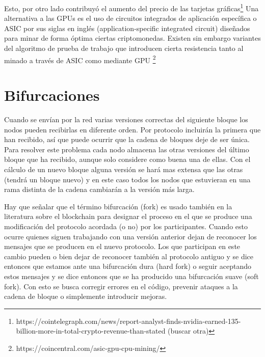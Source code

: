 Esto, por otro lado contribuyó el aumento del precio de las tarjetas gráficas\footnote{https://cointelegraph.com/news/report-analyst-finds-nvidia-earned-135-billion-more-in-total-crypto-revenue-than-stated (buscar otra)}
Una alternativa a las GPUs es el uso de circuitos integrados de aplicación específica o ASIC por sus siglas en inglés (application-specific integrated circuit) diseñados para minar de forma óptima ciertas criptomonedas. Existen sin embargo variantes del algoritmo de prueba de trabajo que introducen cierta resistencia tanto al minado a través de ASIC como mediante GPU \footnote{https://coincentral.com/asic-gpu-cpu-mining/}
\section{Bifurcaciones}\label{cap3:bifurcaciones}
Cuando se envían por la red varias versiones correctas del siguiente bloque los nodos pueden recibirlas en diferente orden. Por protocolo incluirán la primera que han recibido, así que puede ocurrir que la cadena de bloques deje de ser única. Para resolver este problema cada nodo almacena las otras versiones del último bloque que ha recibido, aunque solo considere como buena una de ellas. Con el cálculo de un nuevo bloque alguna versión se hará mas extensa que las otras (tendrá un bloque nuevo) y en este caso todos los nodos que estuvieran en una rama distinta de la cadena cambiarán a la versión más larga.

Hay que señalar que el término bifurcación (fork) es usado también en la literatura sobre el blockchain para designar el proceso en el que se produce una modificación del protocolo acordada (o no) por los participantes. Cuando esto ocurre quienes siguen trabajando con una versión anterior dejan de reconocer los mensajes que se producen en el nuevo protocolo. Los que participan en este cambio pueden o bien dejar de reconocer también al protocolo antiguo y se dice entonces que estamos ante una bifurcación dura (hard fork) o seguir aceptando estos mensajes y se dice entonces que se ha producido una bifurcación suave (soft fork). Con esto se busca corregir errores en el código, prevenir ataques a la cadena de bloque o simplemente introducir mejoras.

